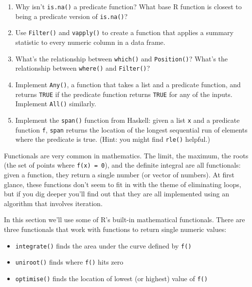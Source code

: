 \begin{enumerate}
\def\labelenumi{\arabic{enumi}.}
\item
  Why isn't \texttt{is.na()} a predicate function? What base R function
  is closest to being a predicate version of \texttt{is.na()}?
\item
  Use \texttt{Filter()} and \texttt{vapply()} to create a function that
  applies a summary statistic to every numeric column in a data frame.
\item
  What's the relationship between \texttt{which()} and
  \texttt{Position()}? What's the relationship between \texttt{where()}
  and \texttt{Filter()}?
\item
  Implement \texttt{Any()}, a function that takes a list and a predicate
  function, and returns \texttt{TRUE} if the predicate function returns
  \texttt{TRUE} for any of the inputs. Implement \texttt{All()}
  similarly.
\item
  Implement the \texttt{span()} function from Haskell: given a list
  \texttt{x} and a predicate function \texttt{f}, \texttt{span} returns
  the location of the longest sequential run of elements where the
  predicate is true. (Hint: you might find \texttt{rle()} helpful.)
\end{enumerate}


Functionals are very common in mathematics. The limit, the maximum, the
roots (the set of points where \texttt{f(x) = 0}), and the definite
integral are all functionals: given a function, they return a single
number (or vector of numbers). At first glance, these functions don't
seem to fit in with the theme of eliminating loops, but if you dig
deeper you'll find out that they are all implemented using an algorithm
that involves iteration.

In this section we'll use some of R's built-in mathematical functionals.
There are three functionals that work with functions to return single
numeric values:  

\begin{itemize}
\itemsep1pt\parskip0pt
\item
  \texttt{integrate()} finds the area under the curve defined by
  \texttt{f()}
\item
  \texttt{uniroot()} finds where \texttt{f()} hits zero
\item
  \texttt{optimise()} finds the location of lowest (or highest) value of
  \texttt{f()}
\end{itemize}

